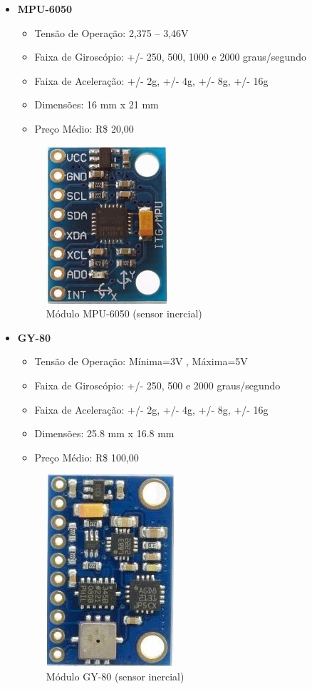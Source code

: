 \begin{itemize}
\item \textbf{MPU-6050}
	\begin{itemize}
		\item Tensão de Operação: 2,375 – 3,46V
		\item Faixa de Giroscópio: +/- 250, 500, 1000 e 2000 graus/segundo
		\item Faixa de Aceleração: +/- 2g, +/- 4g, +/- 8g, +/- 16g
		\item Dimensões: 16 mm x 21 mm
		\item Preço Médio:  R\$ 20,00
	\end{itemize}
\begin{figure}[H]
	\centering	\includegraphics[keepaspectratio=true,scale=1]{figuras/MPU-6050.jpg}
	\caption{Módulo MPU-6050 (sensor inercial)
}
	\label{des_fig2}
\end{figure}
\end{itemize}    



\begin{itemize}
\item \textbf{GY-80}
\begin{itemize}
\item Tensão de Operação: Mínima=3V , Máxima=5V
\item Faixa de Giroscópio: +/- 250, 500 e 2000 graus/segundo
\item Faixa de Aceleração: +/- 2g, +/- 4g, +/- 8g, +/- 16g
\item Dimensões: 25.8 mm x 16.8 mm
\item Preço Médio:  R\$ 100,00
\end{itemize}
\begin{figure}[H]
	\centering	\includegraphics[keepaspectratio=true,scale=1]{figuras/GY-80.jpg}
	\caption{Módulo GY-80 (sensor inercial)}
	\label{des_fig3}
\end{figure}
\end{itemize}

